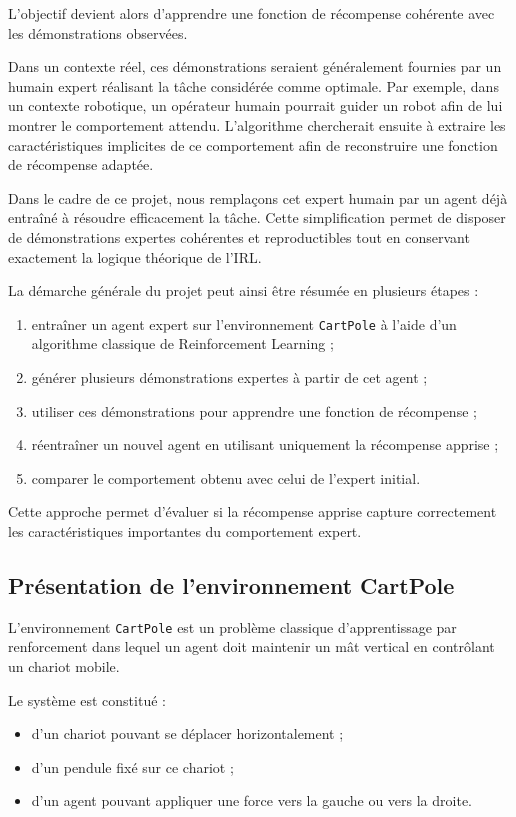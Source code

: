 \documentclass{article}
\begin{document}
L’objectif devient alors d’apprendre une fonction de récompense cohérente avec les démonstrations observées.

Dans un contexte réel, ces démonstrations seraient généralement fournies par un humain expert réalisant la tâche considérée comme optimale. Par exemple, dans un contexte robotique, un opérateur humain pourrait guider un robot afin de lui montrer le comportement attendu. L’algorithme chercherait ensuite à extraire les caractéristiques implicites de ce comportement afin de reconstruire une fonction de récompense adaptée.

Dans le cadre de ce projet, nous remplaçons cet expert humain par un agent déjà entraîné à résoudre efficacement la tâche. Cette simplification permet de disposer de démonstrations expertes cohérentes et reproductibles tout en conservant exactement la logique théorique de l’IRL.

La démarche générale du projet peut ainsi être résumée en plusieurs étapes :
\begin{enumerate}
    \item entraîner un agent expert sur l’environnement \texttt{CartPole} à l’aide d’un algorithme classique de Reinforcement Learning ;
    \item générer plusieurs démonstrations expertes à partir de cet agent ;
    \item utiliser ces démonstrations pour apprendre une fonction de récompense ;
    \item réentraîner un nouvel agent en utilisant uniquement la récompense apprise ;
    \item comparer le comportement obtenu avec celui de l’expert initial.
\end{enumerate}

Cette approche permet d’évaluer si la récompense apprise capture correctement les caractéristiques importantes du comportement expert.

\subsection{Présentation de l’environnement CartPole}

L’environnement \texttt{CartPole} est un problème classique d’apprentissage par renforcement dans lequel un agent doit maintenir un mât vertical en contrôlant un chariot mobile.

Le système est constitué :
\begin{itemize}
    \item d’un chariot pouvant se déplacer horizontalement ;
    \item d’un pendule fixé sur ce chariot ;
    \item d’un agent pouvant appliquer une force vers la gauche ou vers la droite.
\end{itemize}
\end{document}
